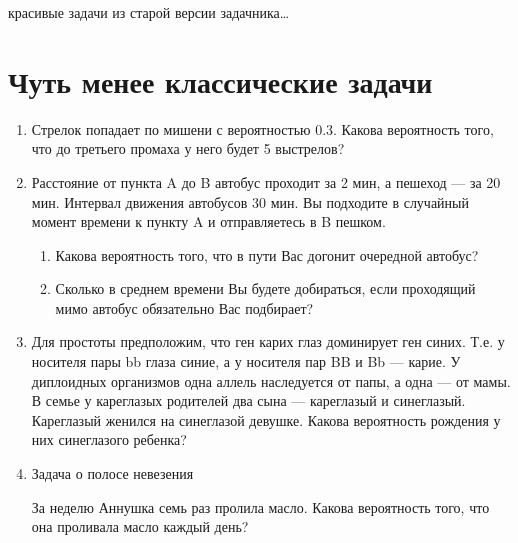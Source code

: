 \documentclass[a4paper]{caesar_book}
\theoremstyle{definition}
\begin{document}
красивые задачи из старой версии задачника\ldots











\section{Чуть менее классические задачи}

\begin{enumerate}
\item Стрелок попадает по мишени с вероятностью 0.3. Какова вероятность того, что до третьего промаха у него будет 5 выстрелов?

\item Расстояние от пункта A до B автобус проходит за 2 мин, а пешеход — за 20 мин. Интервал движения автобусов 30 мин. Вы подходите в случайный момент времени к пункту A и отправляетесь в B пешком.

\begin{enumerate}
\item Какова вероятность того, что в пути Вас догонит очередной автобус?
\item Сколько в среднем времени Вы будете добираться, если проходящий мимо автобус обязательно Вас подбирает?
\end{enumerate}



\item Для простоты предположим, что ген карих глаз доминирует ген синих. Т.е. у носителя пары bb глаза синие, а у носителя пар BB и Bb — карие. У диплоидных
организмов  одна аллель наследуется от папы, а одна — от мамы. В семье у кареглазых родителей два сына — кареглазый и
синеглазый. Кареглазый женился на синеглазой девушке. Какова
вероятность рождения у них синеглазого ребенка?


\item Задача о полосе невезения

За неделю Аннушка семь раз пролила масло. Какова вероятность того, что она проливала масло каждый день?



\end{enumerate}
\end{document}
